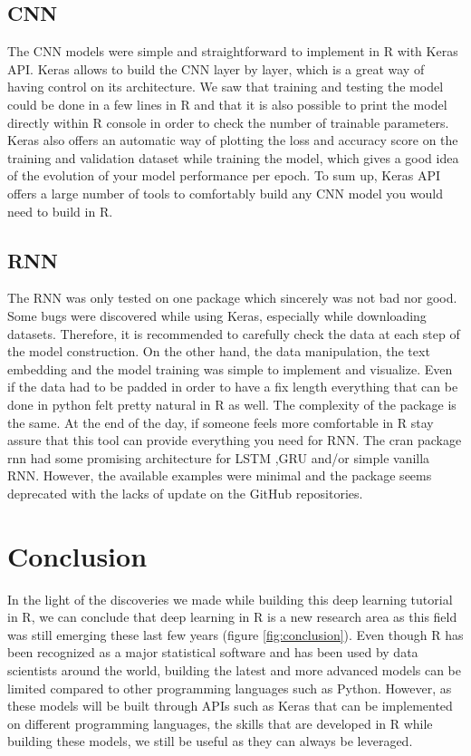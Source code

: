 \documentclass[letter,8pt]{article}\usepackage[]{graphicx}\usepackage[]{color}
\begin{document}
\subsection{CNN}
The CNN models were simple and straightforward to implement in R with Keras API. Keras allows to build the CNN layer by layer, which is a great way of having control on its architecture. We saw that training and testing the model could be done in a few lines in R and that it is also possible to print the model directly within R console in order to check the number of trainable parameters. Keras also offers an automatic way of plotting the loss and accuracy score on the training and validation dataset while training the model, which gives a good idea of the evolution of your model performance per epoch. To sum up, Keras API offers a large number of tools to comfortably build any CNN model you would need to build in R.
\subsection{RNN}
The RNN was only tested on one package which sincerely was not bad nor good. Some bugs were discovered while using Keras, especially while downloading datasets. Therefore, it is recommended to carefully check the data at each step of the model construction. On the other hand,
the data manipulation, the text embedding and the model training was simple to implement and visualize. Even if the data had to be padded in order to have a fix length everything that can be done in python felt pretty natural in R as well. The complexity of the package is the same. At the end of the day, if someone feels more comfortable in R stay assure that this tool can provide everything you need for RNN. The cran package rnn \cite{rnn2019} had some promising architecture for LSTM ,GRU and/or simple vanilla RNN. However, the available examples were minimal and the package seems deprecated with the lacks of update on the GitHub repositories.
\newpage
\section{Conclusion}
In the light of the discoveries we made while building this deep learning tutorial in R, we can conclude that deep learning in R is a new research area as this field was still emerging these last few years (figure \ref{fig:conclusion}). Even though R has been recognized as a major statistical software and has been used by data scientists around the world, building the latest and more advanced models can be limited compared to other programming languages such as Python. However, as these models will be built through APIs such as Keras that can be implemented on different programming languages, the skills that are developed in R while building these models, we still be useful as they can always be leveraged.
\end{document}
